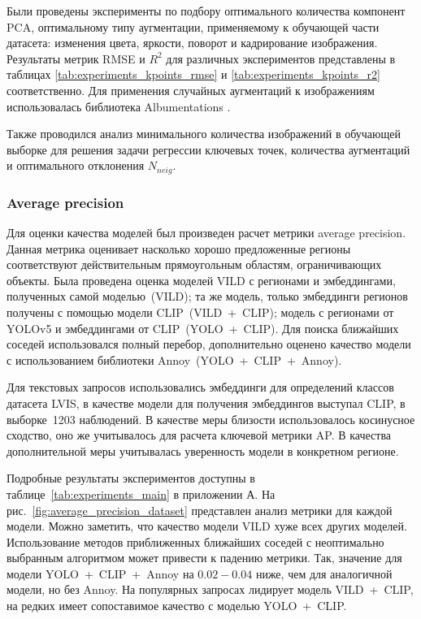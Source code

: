 \documentclass[a4paper,14pt]{article}
\begin{document}
    Были проведены эксперименты по подбору оптимального количества компонент PCA, оптимальному типу аугментации, применяемому к обучающей части датасета: изменения цвета, яркости, поворот и кадрирование изображения. 
    Результаты метрик RMSE и $R^2$ для различных экспериментов представлены в таблицах \ref{tab:experiments_kpoints_rmse} и \ref{tab:experiments_kpoints_r2} соответственно. Для применения случайных аугментаций к изображениям использовалась библиотека Albumentations \cite{albumentations}.
    
    Также проводился анализ  минимального количества изображений в обучающей выборке для решения задачи регрессии ключевых точек, количества аугментаций и оптимального отклонения $N_{neig}$.
    
	\subsubsection{Average precision}
	
	Для оценки качества моделей был произведен расчет метрики average precision.
	Данная метрика оценивает насколько хорошо предложенные регионы соответствуют действительным прямоугольным областям, ограничивающих объекты.
	Была проведена оценка моделей VILD с регионами и эмбеддингами, полученных самой моделью~(VILD);
	та же модель, только эмбеддинги регионов получены с помощью модели CLIP~(VILD~+~CLIP);
	модель с регионами от YOLOv5 и эмбеддингами от CLIP~(YOLO~+~CLIP).
	Для поиска ближайших соседей использовался полный перебор, дополнительно оценено качество модели с использованием библиотеки Annoy~(YOLO~+~CLIP~+~Annoy).
	
 	Для текстовых запросов использовались эмбеддинги для определений классов датасета LVIS, в качестве модели для получения эмбеддингов выступал CLIP, в выборке~1203 наблюдений.
	В качестве меры близости использовалось косинусное сходство, оно же учитывалось для расчета ключевой метрики AP.
	В качества дополнительной меры учитывалась уверенность модели в конкретном регионе.

	Подробные результаты экспериментов доступны в таблице~\ref{tab:experiments_main} в приложении А.
	На рис.~\ref{fig:average_precision_dataset} представлен анализ метрики для каждой модели.
	Можно заметить, что качество модели VILD хуже всех других моделей.
	Использование методов приближенных ближайших соседей с неоптимально выбранным алгоритмом может привести к падению метрики.
	Так, значение для модели YOLO~+~CLIP~+~Annoy на $0.02 - 0.04$ ниже, чем для аналогичной модели, но без Annoy.
	На популярных запросах лидирует модель VILD~+~CLIP, на редких имеет сопоставимое качество с моделью YOLO~+~CLIP.
	
\end{document}

